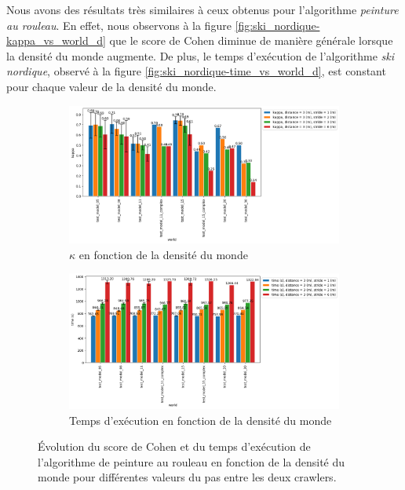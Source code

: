 \documentclass[francais,RandD]{rapportPFE}
\begin{document}
			Nous avons des résultats très similaires à ceux obtenus pour l'algorithme \textit{peinture au rouleau}.
			En effet, nous observons à la figure \ref{fig:ski_nordique-kappa_vs_world_d} que le score de Cohen diminue de manière générale lorsque la densité du monde augmente.
			De plus, le temps d'exécution de l'algorithme \textit{ski nordique}, observé à la figure \ref{fig:ski_nordique-time_vs_world_d}, est constant pour chaque valeur de la densité du monde.

			\begin{figure}[h!]
				\centering
				\begin{subfigure}[t]{0.9\linewidth}
					\includegraphics[width=\linewidth]{graphics/ski_nordique-kappa_vs_world_for_each_s.png}
					\caption{$\kappa$ en fonction de la densité du monde}
					\label{fig:ski_nordique-kappa_vs_world_s}
				\end{subfigure}
				\hfill
				\begin{subfigure}[t]{0.9\linewidth}
						\includegraphics[width=\linewidth]{graphics/ski_nordique-time_vs_world_for_each_s.png}
						\caption{Temps d'exécution en fonction de la densité du monde}
						\label{fig:ski_nordique-time_vs_world_s}
				\end{subfigure}
				\caption{Évolution du score de Cohen et du temps d'exécution de l'algorithme de peinture au rouleau en fonction de la densité du monde pour différentes valeurs du pas entre les deux crawlers.}
				\label{fig:ski_nordique-world_s}
			\end{figure}
\end{document}
